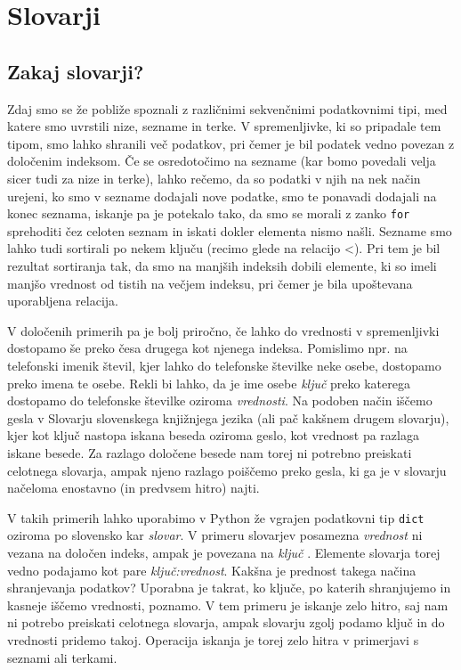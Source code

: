 \chapter{Slovarji}

\section{Zakaj slovarji?}

Zdaj smo se že pobliže spoznali z različnimi sekvenčnimi podatkovnimi tipi, med katere smo uvrstili nize, sezname in terke. V spremenljivke, ki so pripadale tem tipom, smo lahko shranili več podatkov, pri čemer je bil podatek vedno povezan z določenim indeksom. Če se osredotočimo na sezname (kar bomo povedali velja sicer tudi za nize in terke), lahko rečemo, da so podatki v njih na nek način urejeni, ko smo v sezname dodajali nove podatke, smo te ponavadi dodajali na konec seznama, iskanje pa je potekalo tako, da smo se morali z zanko \texttt{for} sprehoditi čez celoten seznam in iskati dokler elementa nismo našli. Sezname smo lahko tudi sortirali po nekem ključu (recimo glede na relacijo <). Pri tem je bil rezultat sortiranja tak, da smo na manjših indeksih dobili elemente, ki so imeli manjšo vrednost od tistih na večjem indeksu, pri čemer je bila upoštevana uporabljena relacija. 

V določenih primerih pa je bolj priročno, če lahko do vrednosti v spremenljivki dostopamo še preko česa drugega kot njenega indeksa. Pomislimo npr. na telefonski imenik števil, kjer lahko do telefonske številke neke osebe, dostopamo preko imena te osebe. Rekli bi lahko, da je ime osebe \emph{ključ} preko katerega dostopamo do telefonske številke oziroma \emph{vrednosti}. Na podoben način iščemo gesla v Slovarju slovenskega knjižnjega jezika (ali pač kakšnem drugem slovarju), kjer kot ključ nastopa iskana beseda oziroma geslo, kot vrednost pa razlaga iskane besede. Za razlago določene besede nam torej ni potrebno preiskati celotnega slovarja, ampak njeno razlago poiščemo preko gesla, ki ga je v slovarju načeloma enostavno (in predvsem hitro) najti.

V takih primerih lahko uporabimo v Python že vgrajen podatkovni tip \texttt{dict}  oziroma po slovensko kar \emph{slovar}. V primeru slovarjev posamezna \emph{vrednost}  ni vezana na določen indeks, ampak je povezana na  \emph{ključ} . Elemente slovarja torej vedno podajamo kot pare \emph{ključ:vrednost}. Kakšna je prednost takega načina shranjevanja podatkov? Uporabna je takrat, ko ključe, po katerih shranjujemo in kasneje iščemo vrednosti, poznamo. V tem primeru je iskanje zelo hitro, saj nam ni potrebo preiskati celotnega slovarja, ampak slovarju zgolj podamo ključ in do vrednosti pridemo takoj. Operacija iskanja je torej zelo hitra v primerjavi s seznami ali terkami.

